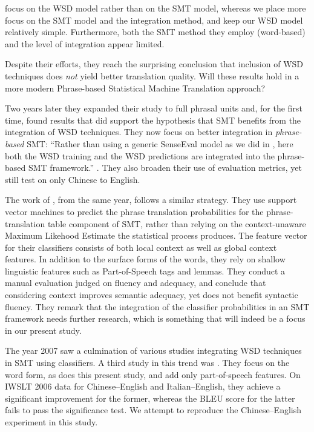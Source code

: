 \documentclass[smallextended]{svjour3}       %
\theoremstyle{break}
\begin{document}
\cite{CarpuatWu05} focus on the WSD model rather than on the SMT
model, whereas we place more focus on the SMT model and the
integration method, and keep our WSD model relatively
simple. Furthermore, both the SMT method they employ (word-based) and
the level of integration appear limited.

Despite their efforts, they reach the surprising conclusion that inclusion of
WSD techniques does \emph{not} yield better translation quality. Will these
results hold in a more modern Phrase-based Statistical Machine Translation
approach?

Two years later they expanded their study to full phrasal units
\citep{CarpuatWu07} and, for the first time, found results that did support the
hypothesis that SMT benefits from the integration of WSD techniques. They now
focus on better integration in \emph{phrase-based} SMT: ``Rather than using a
generic SenseEval model as we did in \cite{CarpuatWu05}, here both the WSD
training and the WSD predictions are integrated into the phrase-based SMT
framework.'' \citep{CarpuatWu07}. They also broaden their use of evaluation
metrics, yet still test on only Chinese to English.

The work of \cite{Gimenez+07}, from the same year, follows a similar
strategy. They use support vector machines to predict the phrase
translation probabilities for the phrase-translation table component
of SMT, rather than relying on the context-unaware Maximum Likehood
Estimate the statistical process produces. The feature vector for
their classifiers consists of both local context as well as global
context features.  In addition to the surface forms of the words, they
rely on shallow linguistic features such as Part-of-Speech tags and
lemmas. They conduct a manual evaluation judged on fluency and
adequacy, and conclude that considering context improves semantic
adequacy, yet does not benefit syntactic fluency. They remark that the
integration of the classifier probabilities in an SMT framework needs
further research, which is something that will indeed be a focus in
our present study.

The year 2007 saw a culmination of various studies integrating WSD techniques in
SMT using classifiers. A third study in this trend was \cite{Stroppa+07}. They
focus on the word form, as does this present study, and add only
part-of-speech features. On IWSLT 2006 data for Chinese--English and
Italian--English, they achieve a significant improvement for the former, whereas
the BLEU score for the latter fails to pass the significance test. We 
attempt to reproduce the Chinese--English experiment in this study.
\end{document}
